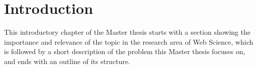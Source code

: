 
\chapter{Introduction} %
\label{cha:introduction}

This introductory chapter of the Master thesis starts with a section showing the importance and relevance of the topic in the research area of Web Science, which is followed by a short description of the problem this Master thesis focuses on, and ends with an outline of its structure.







